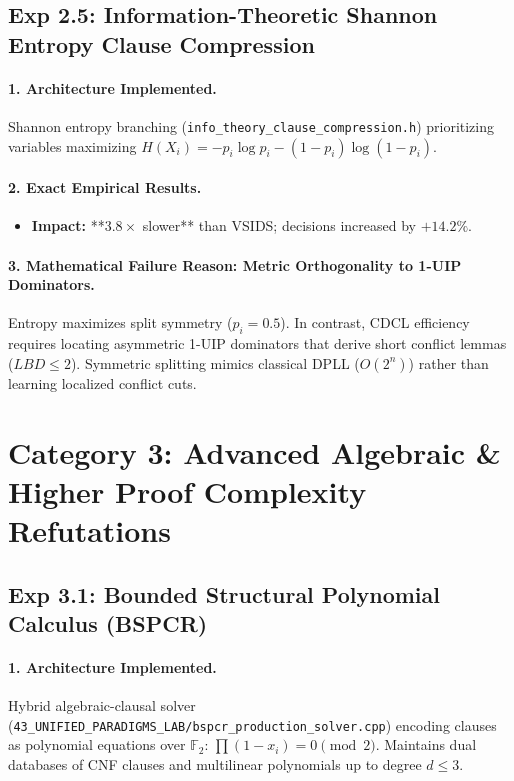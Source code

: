 \documentclass[11pt]{article}
\theoremstyle{definition}
\begin{document}
\subsection{Exp 2.5: Information-Theoretic Shannon Entropy Clause Compression}
\paragraph{1. Architecture Implemented.}
Shannon entropy branching (\texttt{info_theory_clause_compression.h}) prioritizing variables maximizing $H(X_i) = -p_i \log p_i - (1-p_i)\log(1-p_i)$.

\paragraph{2. Exact Empirical Results.}
\begin{itemize}
    \item \textbf{Impact:} **$3.8\times$ slower** than VSIDS; decisions increased by $+14.2\%$.
\end{itemize}

\paragraph{3. Mathematical Failure Reason: Metric Orthogonality to 1-UIP Dominators.}
Entropy maximizes split symmetry ($p_i = 0.5$). In contrast, CDCL efficiency requires locating asymmetric 1-UIP dominators that derive short conflict lemmas ($LBD \le 2$). Symmetric splitting mimics classical DPLL ($O(2^n)$) rather than learning localized conflict cuts.

\newpage
\section{Category 3: Advanced Algebraic \& Higher Proof Complexity Refutations}

\subsection{Exp 3.1: Bounded Structural Polynomial Calculus (BSPCR)}
\paragraph{1. Architecture Implemented.}
Hybrid algebraic-clausal solver (\texttt{43_UNIFIED_PARADIGMS_LAB/bspcr_production_solver.cpp}) encoding clauses as polynomial equations over $\mathbb{F}_2$: $\prod (1 - x_i) = 0 \pmod 2$. Maintains dual databases of CNF clauses and multilinear polynomials up to degree $d \le 3$.
\end{document}
